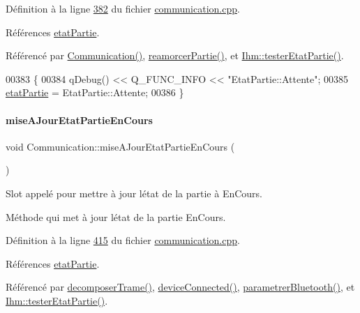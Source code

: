 Définition à la ligne \hyperlink{communication_8cpp_source_l00382}{382} du fichier \hyperlink{communication_8cpp_source}{communication.\+cpp}.



Références \hyperlink{communication_8h_source_l00100}{etat\+Partie}.



Référencé par \hyperlink{communication_8cpp_source_l00022}{Communication()}, \hyperlink{communication_8cpp_source_l00305}{reamorcer\+Partie()}, et \hyperlink{ihm_8cpp_source_l00641}{Ihm\+::tester\+Etat\+Partie()}.


\begin{DoxyCode}
00383 \{
00384     qDebug() << Q\_FUNC\_INFO << \textcolor{stringliteral}{"EtatPartie::Attente"};
00385     \hyperlink{class_communication_a2539ded2780db2c732690c585c768c96}{etatPartie} = EtatPartie::Attente;
00386 \}
\end{DoxyCode}
\mbox{\label{class_communication_a1f90de1ff5f98de887b9c77664e105c7}} 
\paragraph{\texorpdfstring{mise\+A\+Jour\+Etat\+Partie\+En\+Cours}{miseAJourEtatPartieEnCours}}
{\footnotesize\ttfamily void Communication\+::mise\+A\+Jour\+Etat\+Partie\+En\+Cours (\begin{DoxyParamCaption}{ }\end{DoxyParamCaption})\hspace{0.3cm}{\ttfamily [slot]}}



Slot appelé pour mettre à jour l\textquotesingle{}état de la partie à En\+Cours. 

Méthode qui met à jour l\textquotesingle{}état de la partie En\+Cours. 

Définition à la ligne \hyperlink{communication_8cpp_source_l00415}{415} du fichier \hyperlink{communication_8cpp_source}{communication.\+cpp}.



Références \hyperlink{communication_8h_source_l00100}{etat\+Partie}.



Référencé par \hyperlink{communication_8cpp_source_l00188}{decomposer\+Trame()}, \hyperlink{communication_8cpp_source_l00329}{device\+Connected()}, \hyperlink{communication_8cpp_source_l00059}{parametrer\+Bluetooth()}, et \hyperlink{ihm_8cpp_source_l00641}{Ihm\+::tester\+Etat\+Partie()}.


